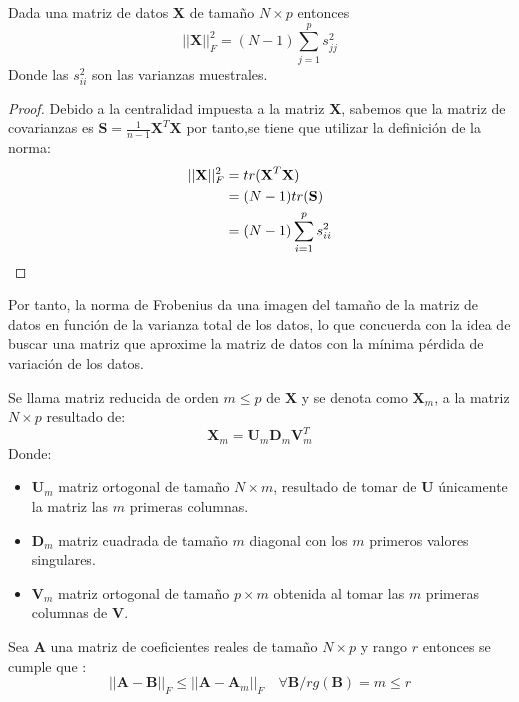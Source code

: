 \begin{propo}
Dada una matriz de datos \textbf{X} de tamaño $N\times p$ entonces
\begin{equation}
||\textbf{X}||_F^2=(N-1)\sum_{j=1}^p s_{jj}^2
\end{equation}
Donde las $s_{ii}^2$ son las varianzas muestrales.
\begin{proof}
Debido a la centralidad impuesta a la matriz \textbf{X}, sabemos que la matriz de covarianzas es $\textbf{S}=\frac{1}{n-1}\textbf{X}^T \textbf{X}$ por tanto,se tiene que utilizar la definición de la norma:
\begin{align*}
||\textbf{X}||_F^2 &= tr(\textbf{X}^T\textbf{X})\\
&= (N-1) tr(\textbf{S})\\
&= (N-1) \sum_{i=1}^p s_{ii}^2 \qedhere
\end{align*}
\end{proof}
\end{propo}
\noindent Por tanto, la norma de Frobenius da una imagen del tamaño de la matriz de datos en función de la varianza total de los datos, lo que concuerda con la idea de buscar una matriz que aproxime la matriz de datos con la mínima pérdida de variación de los datos.  

\begin{defi}
Se llama matriz reducida de orden $m\leq p$ de $\textbf{X}$ y se denota como $\textbf{X}_m$, a la matriz $N\times p$ resultado de:
\begin{equation}
\textbf{X}_m=\textbf{U}_m\mathbf{D}_m\textbf{V}^T_m
\end{equation}
Donde:
\begin{itemize}
\item $\textbf{U}_m$ matriz ortogonal de tamaño $N \times m$, resultado de tomar de \textbf{U} únicamente la matriz las $m$ primeras columnas. 
\item $\mathbf{D}_m$  matriz cuadrada de tamaño $m$ diagonal con los $m$ primeros valores singulares. 
\item $\textbf{V}_m$ matriz ortogonal de tamaño $p \times m$ obtenida al tomar las $m$ primeras columnas de \textbf{V}.
\end{itemize}
\end{defi}

\begin{teorema}
Sea \textbf{A} una matriz de coeficientes reales de tamaño $N\times p$ y rango $r$  entonces se cumple que \cite{Eckart 1936, Golub 1987}:
\begin{equation}
||\textbf{A}-\textbf{B}||_F\leq ||\textbf{A}-\textbf{A}_m||_F \quad \forall \textbf{B}/ rg(\textbf{B})=m \leq r
\end{equation} 
\end{teorema}

